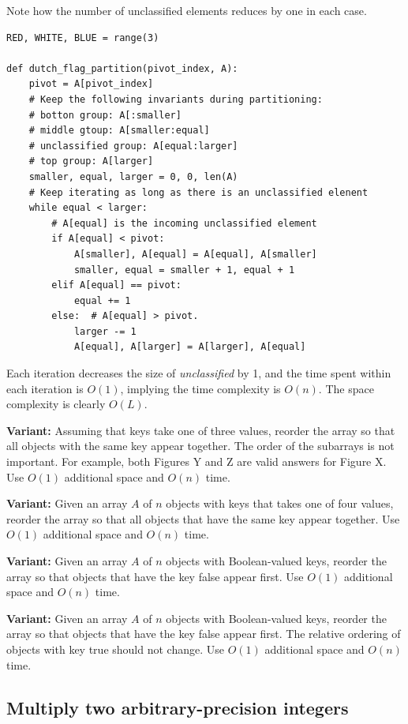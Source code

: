 \documentclass[11pt,a4paper]{article}
\begin{document}
Note how the number of unclassified elements reduces by one in each case.

\begin{verbatim}
RED, WHITE, BLUE = range(3)

def dutch_flag_partition(pivot_index, A):
    pivot = A[pivot_index]
    # Keep the following invariants during partitioning:
    # botton group: A[:smaller]
    # middle gtoup: A[smaller:equal]
    # unclassified group: A[equal:larger]
    # top group: A[larger]
    smaller, equal, larger = 0, 0, len(A)
    # Keep iterating as long as there is an unclassified elenent
    while equal < larger:
        # A[equal] is the incoming unclassified element
        if A[equal] < pivot:
            A[smaller], A[equal] = A[equal], A[smaller]
            smaller, equal = smaller + 1, equal + 1 
        elif A[equal] == pivot:
            equal += 1
        else:  # A[equal] > pivot.
            larger -= 1
            A[equal], A[larger] = A[larger], A[equal]
\end{verbatim}

Each iteration decreases the size of \emph{unclassified} by 1, and the time
spent within each iteration is $O(1)$, implying the time complexity is $O(n)$.
The space complexity is clearly $O(L)$.

\textbf{Variant:} Assuming that keys take one of three values, reorder the
array so that all objects with the same key appear together. The order of the
subarrays is not important. For example, both Figures Y and Z are valid
answers for Figure X. Use $O(1)$ additional space and $O(n)$ time.

\textbf{Variant:} Given an array $A$ of $n$ objects with keys that takes one
of four values, reorder the array so that all objects that have the same key
appear together. Use $O(1)$ additional space and $O(n)$ time.

\textbf{Variant:} Given an array $A$ of $n$ objects with Boolean-valued keys,
reorder the array so that objects that have the key false appear first. Use
$O(1)$ additional space and $O(n)$ time.

\textbf{Variant:} Given an array $A$ of $n$ objects with Boolean-valued keys,
reorder the array so that objects that have the key false appear first. The
relative ordering of objects with key true should not change. Use $O(1)$
additional space and $O(n)$ time.

\subsection{Multiply two arbitrary-precision integers}
\end{document}
